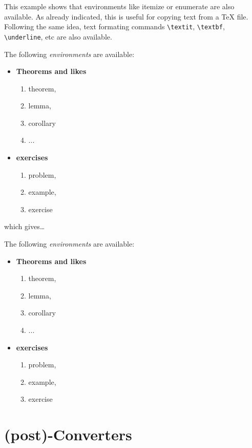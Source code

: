     This example shows that environments like itemize or enumerate are also
available. As already indicated, this is useful for copying text from a
TeX file. Following the same idea, text formating commands
\texttt{\textbackslash{}textit}, \texttt{\textbackslash{}textbf},
\texttt{\textbackslash{}underline}, etc are also available.

    \begin{listing}
The following \textit{environments} are available:
\begin{itemize}
    \item \textbf{Theorems and likes}
    \begin{enumerate}
        \item theorem,
        \item lemma,
        \item corollary
        \item ...
    \end{enumerate}
    \item \textbf{exercises}
    \begin{enumerate}
        \item problem,
        \item example,
        \item exercise
    \end{enumerate}
\end{itemize}
\end{listing}

    which gives\ldots{}

The following \textit{environments} are available:

\begin{itemize}
\item \textbf{Theorems and likes}
\begin{enumerate}
\item theorem,
\item lemma,
\item corollary
\item ...
\end{enumerate}
\item \textbf{exercises}
\begin{enumerate}
\item problem,
\item example,
\item exercise
\end{enumerate}
\end{itemize}

    \section{(post)-Converters}\label{post-converters}

